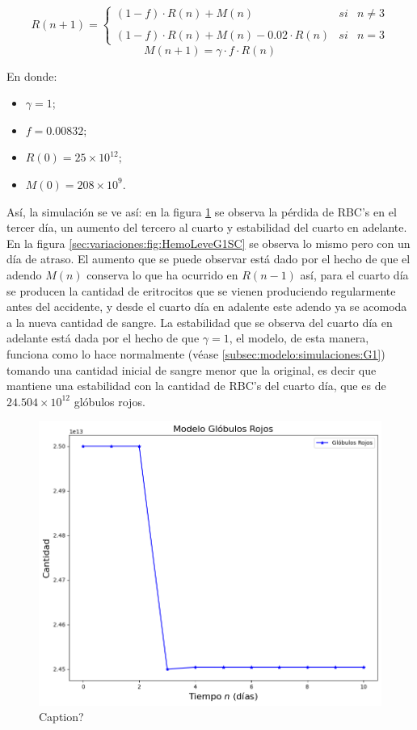 $$R(n+1)= \left\{ \begin{array}{lcc} (1-f)\cdot R(n)+M(n) & si & n \neq 3 \\ \\ (1-f)\cdot R(n)+M(n)-0.02\cdot R(n) & si & n = 3\end{array} \right.$$
$$M(n+1)=\gamma \cdot f \cdot R(n)$$

En donde:
\begin{itemize}
    \item $\gamma=1$;
    \item $f=0.00832$;
    \item $R(0) = 25\times 10^{12};$
    \item $M(0) = 208 \times 10^{9}.$
\end{itemize}

Así, la simulación se ve así: en la figura \ref{sec:variaciones:fig:HemoLeveG1RBC} se observa la pérdida de RBC's en el tercer día, un aumento del tercero al cuarto y estabilidad del cuarto en adelante. En la figura \ref{sec:variaciones:fig:HemoLeveG1SC} se observa lo mismo pero con un día de atraso. El aumento que se puede observar está dado por el hecho de que el adendo $M(n)$ conserva lo que ha ocurrido en $R(n-1)$ así, para el cuarto día se producen la cantidad de eritrocitos que se vienen produciendo regularmente antes del accidente, y desde el cuarto día en adalente este adendo ya se acomoda a la nueva cantidad de sangre. La estabilidad que se observa del cuarto día en adelante está dada por el hecho de que $\gamma = 1$, el modelo, de esta manera, funciona como lo hace normalmente (véase \ref{subsec:modelo:simulaciones:G1}) tomando una cantidad inicial de sangre menor que la original, es decir que mantiene una estabilidad con la cantidad de RBC's del cuarto día, que es de $24.504\times 10^{12}$ glóbulos rojos. 

\begin{figure}[H]
    \centering
    \includegraphics[scale=0.57]{figures/HemoLeveG1RBC.png}
    \caption{Caption?}
    \label{sec:variaciones:fig:HemoLeveG1RBC}
\end{figure}


